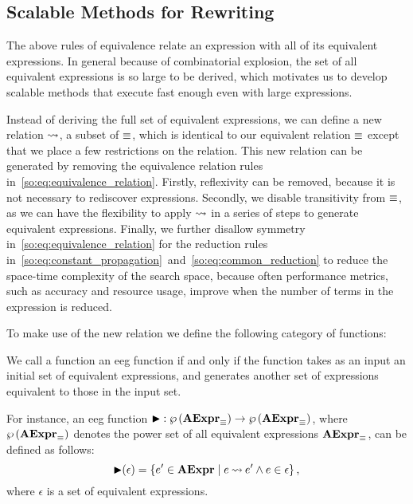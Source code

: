 \subsection{Scalable Methods for Rewriting}
\label{so:sub:scalable}

The above rules of equivalence relate an expression with all of its equivalent
expressions.  In general because of combinatorial explosion, the set of all
equivalent expressions is so large to be derived, which motivates us to develop
scalable methods that execute fast enough even with large expressions.

Instead of deriving the full set of equivalent expressions, we can define
a new relation $\mathbin{\rightsquigarrow}$, a subset of $\equiv$, which is identical to
our equivalent relation $\equiv$ except that we place a few restrictions
on the relation.  This new relation can be generated by removing the
equivalence relation rules in~\eqref{so:eq:equivalence_relation}.  Firstly,
reflexivity can be removed, because it is not necessary to rediscover
expressions.  Secondly, we disable transitivity from $\equiv$, as we
can have the flexibility to apply $\mathbin{\rightsquigarrow}$ in a series of steps
to generate equivalent expressions.  Finally, we further disallow
symmetry in~\eqref{so:eq:equivalence_relation} for the reduction rules
in~\eqref{so:eq:constant_propagation}~and~\eqref{so:eq:common_reduction} to
reduce the space-time complexity of the search space, because often performance
metrics, such as accuracy and resource usage, improve when the number of terms
in the expression is reduced.

To make use of the new relation we define the following category of functions:
\begin{definition}
    We call a function an \gls{eeg} function if and only if the function takes
    as an input an initial set of equivalent expressions, and generates another
    set of expressions equivalent to those in the input set.
\end{definition}

For instance, an \gls{eeg} function $\operatorname{\blacktriangleright}: \wp\left({\mathbf{AExpr}_\equiv}\right) \to
\wp\left({\mathbf{AExpr}_\equiv}\right)$, where $\wp\left({\mathbf{AExpr}_\equiv}\right)$ denotes the power set of all
equivalent expressions $\mathbf{AExpr}_\equiv$, can be defined as follows:
\begin{equation}
    \operatorname{\blacktriangleright}(\epsilon) = \left\{
        e^\prime\in\mathbf{AExpr} \mid
        e \mathbin{\rightsquigarrow} e^\prime \wedge e\in\epsilon\right\},
    \label{so:eq:eqstep}
\end{equation}
where $\epsilon$ is a set of equivalent expressions.

